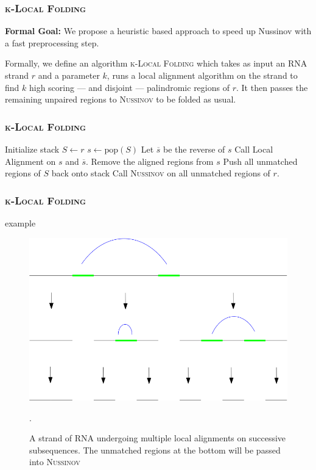 \documentclass{beamer}
\newcommand{\klf}{\textsc{k-Local Folding} }
\newcommand{\rf}{\textsc{Nussinov} }
\newcommand{\s}{\vspace{1cm}}
\begin{document}
\begin{frame}
\frametitle{\klf}
\textbf{Formal Goal:} We propose a heuristic based approach to speed up Nussinov with a fast preprocessing step. \s

Formally, we define an algorithm \klf which takes as input an RNA strand $r$ and a parameter $k$, runs a local alignment algorithm on the strand to find $k$ high scoring --- and disjoint --- palindromic regions of $r$. It then passes the remaining unpaired regions to \rf to be folded as usual.
\end{frame}

\begin{frame}
\frametitle{\klf} 
\begin{algorithmic}[1]
\State Initialize stack $S\gets r$
\State $s\gets \text{pop}(S)$
\State Let $\overline{s}$ be the reverse of $s$
\State Call Local Alignment on $s$ and $\overline{s}$.
\State Remove the aligned regions from $s$
\State Push all unmatched regions of $S$ back onto stack
\EndIf 
\EndWhile
\State Call \rf on all unmatched regions of $r$. 
\EndProcedure
\end{algorithmic}
\end{frame}

\begin{frame}
\frametitle{\klf}
\begin{block}{example}
\begin{figure}
\centering
\includegraphics[scale=0.28]{images/k_local_sequence.png}
\caption{A strand of RNA undergoing multiple local alignments on successive subsequences. The unmatched regions at the bottom will be passed into \rf}. 
\end{figure}
\end{block}
\end{frame}
\end{document}
